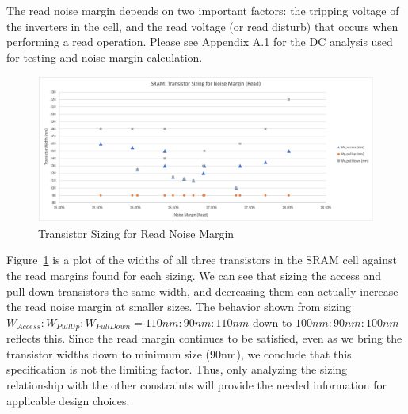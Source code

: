 \documentclass[10pt,letterpaper,onecolumn]{article}
\begin{document}
The read noise margin depends on two important factors: the tripping voltage of the inverters in the cell, and the read voltage (or read disturb) that occurs when performing a read operation. Please see Appendix A.1 for the DC analysis used for testing and noise margin calculation.
\begin{figure}[h!]
\centering
\includegraphics[clip,width=\columnwidth]{Problem2-NM_Read.png}
\caption{Transistor Sizing for Read Noise Margin}
\label{fig:NM_Read}
\end{figure}
Figure~\ref{fig:NM_Read} is a plot of the widths of all three transistors in the SRAM cell against the read margins found for each sizing. We can see that sizing the access and pull-down transistors the same width, and decreasing them can actually increase the read noise margin at smaller sizes. The behavior shown from sizing $W_{Access}:W_{PullUp}:W_{PullDown} = 110nm:90nm:110nm$ down to $100nm:90nm:100nm$ reflects this.
Since the read margin continues to be satisfied, even as we bring the transistor widths down to minimum size (90nm), we conclude that this specification is not the limiting factor. Thus, only analyzing the sizing relationship with the other constraints will provide the needed information for applicable design choices.
\end{document}
